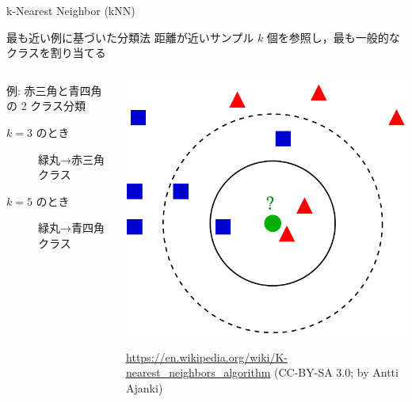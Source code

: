 \documentclass[unicode, 12pt, xdvipdfmx, aspectratio=43]{beamer}
\begin{document}
\begin{frame}[label={sec:orgcacf851}]{k-Nearest Neighbor (kNN)}
\begin{block}{最も近い例に基づいた分類法}
\vspace{0.5cm}
距離が近いサンプル \(k\) 個を参照し，最も一般的なクラスを割り当てる

\begin{columns}
\begin{column}{0.65\columnwidth}
\begin{block}{例: 赤三角と青四角の 2 クラス分類}
\begin{description}
\item[{\(k = 3\) のとき}] 緑丸→赤三角クラス
\item[{\(k = 5\) のとき}] 緑丸→青四角クラス
\end{description}
\end{block}
\end{column}

\begin{column}{0.35\columnwidth}
\begin{center}
\includegraphics[width=\linewidth]{./figure/KnnClassification.pdf}
\end{center}
\tiny
\url{https://en.wikipedia.org/wiki/K-nearest\_neighbors\_algorithm} (CC-BY-SA 3.0; by Antti Ajanki)
\end{column}
\end{columns}
\end{block}
\end{frame}
\end{document}
